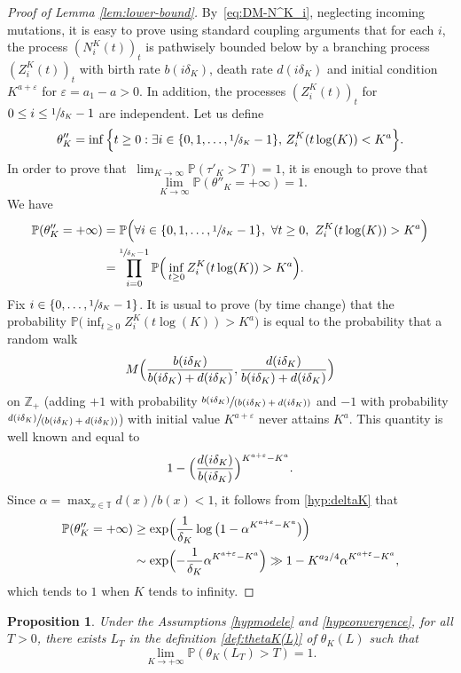 \documentclass[10pt]{amsart}
\let\sep:
\newcommand{\spfrac}[2]{\sfrac{#1}{(#2)}}
\theoremstyle{plain}
\newtheorem{prop}[theorem]{Proposition}
\theoremstyle{remark}
\newcommand\T{\mathbb{T}}
\newcommand\Z{\mathbb{Z}}
\begin{document}
\begin{proof}[Proof of Lemma \ref{lem:lower-bound}]
By~\eqref{eq:DM-N^K_i}, neglecting incoming mutations, it is easy to prove using standard coupling arguments that for each $i$, the process $(N_i^K(t))_{t}$ is pathwisely bounded below by a branching process $(Z_i^K(t))_{t}$ with birth rate $b(i\delta_K)$, death rate $d(i\delta_K)$ and initial condition $K^{a+\varepsilon}$ for $\varepsilon=a_1-a>0$.
In addition, the processes $(Z_i^K(t))_{t}$ for $0\leq i\leq \sfrac{1}{\delta_K}-1$ are independent. Let us define
\[
\theta''_{K} = \inf\Big\{t\ge 0\sep \exists i \in \{0, 1,\dots, \sfrac{1}{\delta_K}-1\},\, Z^K_i(t\log(K)) < K^a\Big\} .
\]
In order to prove that $\ \lim_{K\to \infty} \mathbb{P}(\tau'_{K}>T) =1$, it is enough to prove that
\[\ \lim_{K\to \infty} \mathbb{P}(\theta''_{K}=+\infty) =1.\]
We have
\begin{align*}
\mathbb{P}(\theta''_{K}=+\infty) &= \mathbb{P}\Big(\forall i\in \{0,1,\dots, \sfrac{1}{\delta_K}-1\} ,\ \forall t\geq 0,\ Z^K_i(t \log(K)) >K^a\Big)\\
&= \prod_{i=0}^{\sfrac{1}{\delta_K}-1}\mathbb{P}\Big(\inf_{t\ge 0} Z^K_i(t\log(K)) >K^a\Big).
\end{align*}
Fix $i\in\{0,\ldots,\sfrac{1}{\delta_K}-1\}$. It is usual to prove (by time change) that the probability $\mathbb{P}\big(\inf_{t\ge 0} Z^K_i(t\log(K)) >K^a\big)$ is equal to the probability that a random walk
\[
M\Bigl({b(i\delta_K)\over b(i\delta_K)+d(i\delta_K)}, {d(i\delta_K)\over b(i\delta_K)+d(i\delta_K)}\Bigl)
\]
on $\Z_{+}$ (adding $+1$ with probability $\spfrac{b(i\delta_K)}{b(i\delta_K)+d(i\delta_K)}$ and $-1$ with probability $\spfrac{d(i\delta_K)}{b(i\delta_K)+d(i\delta_K)}$) with initial value $K^{a+\varepsilon}$ never attains $K^a$.
This quantity is well known and equal to
\[1 -\Big({d(i\delta_K)\over b(i\delta_K)}\Big)^{K^{a+\varepsilon}-K^a}.\]
Since $\alpha=\max_{x\in\T}d(x)/b(x)<1$, it follows from \eqref{hyp:deltaK} that
\begin{align*}
\mathbb{P}(\theta''_{K}=+\infty) &\geq \exp\Bigl({1\over \delta_K} \log\big(1 -\alpha^{K^{a+\varepsilon}-K^a}\big)\Bigr)\\
&\sim \exp\Bigl(- {1\over \delta_K}\alpha^{K^{a+\varepsilon}-K^a}\Bigr)\gg 1-K^{{a_2}/4} \alpha^{K^{a+\varepsilon}-K^a},
\end{align*}
which tends to $1$ when $K$ tends to infinity.
\end{proof}

\begin{prop}
\label{prop:Lipschitz-estimate}
Under the Assumptions \ref{hypmodele} and \ref{hypconvergence}, for all $T>0$, there exists $L_T$ in the definition \eqref{def:thetaK(L)} of $\theta_K(L)$ such that
\[
\lim_{K\to+\infty}\mathbb{P}(\theta_K(L_T)>T)=1.
\]
\end{prop}
\end{document}
